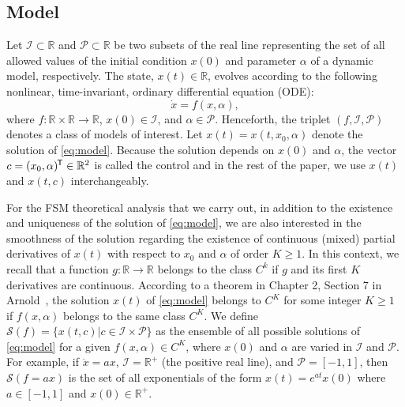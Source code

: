 \documentclass{article}
\newcommand*{\tran}{^{\mkern-1.5mu\mathsf{T}}}
\begin{document}
\subsection{Model} \label{sec:model}
Let $\mathcal{I} \subset \mathbb{R}$ and $\mathcal{P} \subset \mathbb{R}$ be two subsets of the real line representing the set of all allowed values of the initial condition $x(0)$ and parameter $\alpha$ of a dynamic model, respectively. The state, $x(t) \in \mathbb{R}$, evolves according to the following nonlinear, time-invariant, ordinary differential equation (ODE):
\begin{equation}
    \dot{x} = f(x,\alpha), \label{eq:model}
\end{equation}
where $f:\mathbb{R}\times\mathbb{R} \to \mathbb{R}$, $x(0) \in \mathcal{I}$, and $\alpha \in \mathcal{P}$. Henceforth, the triplet $(f,\mathcal{I},\mathcal{P})$ denotes a class of models of interest. Let $x(t) = x(t,x_0,\alpha)$ denote the solution of \cref{eq:model}. Because the solution depends on $x(0)$ and $\alpha$, the vector $c = (x_0,\alpha)\tran \in \mathbb{R}^2$ is called the control and in the rest of the paper, we use $x(t)$ and $x(t,c)$ interchangeably. 

For the FSM theoretical analysis that we carry out, in addition to the existence and uniqueness of the solution of \cref{eq:model}, we are also interested in the smoothness of the solution regarding the existence of continuous (mixed) partial derivatives of $x(t)$ with respect to $x_0$ and $\alpha$ of order $K \ge 1$. In this context, we recall that a function $g: \mathbb{R} \to \mathbb{R}$ belongs to the class $C^k$ if $g$ and its first $K$ derivatives are continuous. According to a theorem in Chapter 2, Section 7 in Arnold~\cite{arnold1992ordinary}, the solution $x(t)$ of \cref{eq:model} belongs to $C^K$ for some integer $K \ge 1$ if $f(x,\alpha)$ belongs to the same class $C^K$. We define $\mathcal{S}(f) = \{ x(t,c) | c\in \mathcal{I} \times \mathcal{P} \}$ as the ensemble of all possible solutions of \cref{eq:model} for a given $f(x,\alpha) \in C^K$, where $x(0)$ and $\alpha$ are varied in $\mathcal{I}$ and $\mathcal{P}$. For example, if $\dot{x} = ax$, $\mathcal{I}=\mathbb{R}^{+}$ (the positive real line), and $\mathcal{P} = [-1, 1]$, then $\mathcal{S}(f=ax)$ is the set of all exponentials of the form $x(t) = e^{at}x(0)$ where $a\in[-1,1]$ and $x(0) \in \mathbb{R}^{+}$. 
\end{document}
